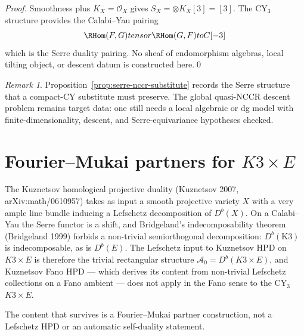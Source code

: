 \documentclass[12pt]{amsart}
\theoremstyle{remark}
\newtheorem{rmk}[thm]{Remark}
\providecommand{\cO}{\mathcal{O}}
\begin{document}
\begin{proof}
  Smoothness plus $K_X = \cO_X$ gives $S_X = \otimes K_X[3] = [3]$.
  The CY$_3$ structure provides the Calabi--Yau pairing
  $$\RHom(F, G) \otimes \RHom(G, F) \to \C[-3]$$
  which is the Serre duality pairing.  No sheaf of endomorphism algebras,
  local tilting object, or descent datum is constructed here.\qed
\end{proof}

\begin{rmk}
  Proposition~\ref{prop:serre-nccr-substitute} records the Serre
  structure that a compact-CY substitute must preserve.  The global
  quasi-NCCR descent problem remains target data: one still needs a local
  algebraic or dg model with finite-dimensionality, descent, and
  Serre-equivariance hypotheses checked.
\end{rmk}

\section{Fourier--Mukai partners for $K3 \times E$}

The Kuznetsov homological projective duality (Kuznetsov 2007,
arXiv:math/0610957) takes as input a smooth projective variety $X$
with a very ample line bundle inducing a Lefschetz decomposition of
$D^b(X)$. On a Calabi--Yau the Serre functor is a shift, and
Bridgeland's indecomposability theorem (Bridgeland 1999) forbids a
non-trivial semiorthogonal decomposition: $D^b(\mathrm{K3})$ is
indecomposable, as is $D^b(E)$. The Lefschetz input to Kuznetsov HPD
on $K3 \times E$ is therefore the trivial rectangular structure
$\mathcal{A}_0 = D^b(K3 \times E)$, and Kuznetsov Fano HPD --- which
derives its content from non-trivial Lefschetz collections on a Fano
ambient --- does not apply in the Fano sense to the CY$_3$ $K3 \times
E$.

The content that survives is a Fourier--Mukai partner construction,
not a Lefschetz HPD or an automatic self-duality statement.
\end{document}
